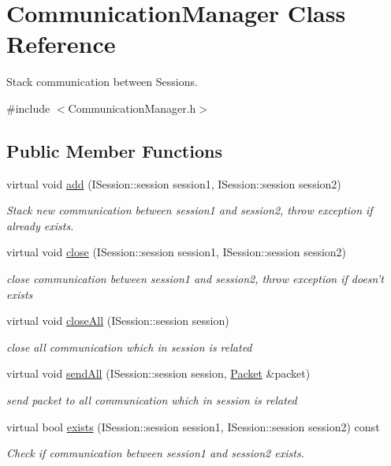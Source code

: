 \hypertarget{class_communication_manager}{\section{Communication\-Manager Class Reference}
\label{class_communication_manager}
}


Stack communication between Sessions.  




{\ttfamily \#include $<$Communication\-Manager.\-h$>$}

\subsection*{Public Member Functions}
\begin{DoxyCompactItemize}
\item 
virtual void \hyperlink{class_communication_manager_a61bb1f5dc835a45386336d66a8d29df6}{add} (I\-Session\-::session session1, I\-Session\-::session session2)
\begin{DoxyCompactList}\small\item\em Stack new communication between session1 and session2, throw exception if already exists. \end{DoxyCompactList}\item 
virtual void \hyperlink{class_communication_manager_a2407d8fe327c508a908a17ae59026770}{close} (I\-Session\-::session session1, I\-Session\-::session session2)
\begin{DoxyCompactList}\small\item\em close communication between session1 and session2, throw exception if doesn't exists \end{DoxyCompactList}\item 
virtual void \hyperlink{class_communication_manager_a711cd6d95cbf28f8f4019abb5404b3f8}{close\-All} (I\-Session\-::session session)
\begin{DoxyCompactList}\small\item\em close all communication which in session is related \end{DoxyCompactList}\item 
virtual void \hyperlink{class_communication_manager_a9c6d619c4df5652b351cc45a04aa6df6}{send\-All} (I\-Session\-::session session, \hyperlink{class_packet}{Packet} \&packet)
\begin{DoxyCompactList}\small\item\em send packet to all communication which in session is related \end{DoxyCompactList}\item 
virtual bool \hyperlink{class_communication_manager_ae2cee89208eb5a2210f9730a7a54a78e}{exists} (I\-Session\-::session session1, I\-Session\-::session session2) const 
\begin{DoxyCompactList}\small\item\em Check if communication between session1 and session2 exists. \end{DoxyCompactList}\end{DoxyCompactItemize}


